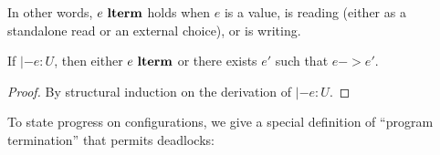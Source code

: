In other words, $e~\textbf{lterm}$ holds when $e$ is a value, is reading (either as a
standalone read or an external choice), or is writing.

\begin{lemma}
  If $|- e : U$, then either $e~\textbf{lterm}$
  or there exists $e'$ such that $e -> e'$.
  \begin{proof}
    By structural induction on the derivation of $|- e : U$.
  \end{proof}
\end{lemma}

To state progress on configurations, we give a special definition of ``program
termination'' that permits deadlocks:\smallskip

